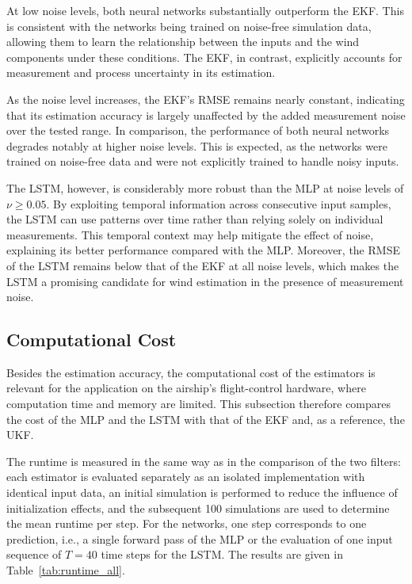 At low noise levels, both neural networks substantially outperform the EKF. This is consistent with the networks being trained on noise-free simulation data, allowing them to learn the relationship between the inputs and the wind components under these conditions. The EKF, in contrast, explicitly accounts for measurement and process uncertainty in its estimation.

As the noise level increases, the EKF's RMSE remains nearly constant, indicating that its estimation accuracy is largely unaffected by the added measurement noise over the tested range. In comparison, the performance of both neural networks degrades notably at higher noise levels. This is expected, as the networks were trained on noise-free data and were not explicitly trained to handle noisy inputs.

The LSTM, however, is considerably more robust than the MLP at noise levels of $\nu \geq 0.05$. By exploiting temporal information across consecutive input samples, the LSTM can use patterns over time rather than relying solely on individual measurements. This temporal context may help mitigate the effect of noise, explaining its better performance compared with the MLP. Moreover, the RMSE of the LSTM remains below that of the EKF at all noise levels, which makes the LSTM a promising candidate for wind estimation in the presence of measurement noise.





\subsection{Computational Cost}
\label{sec:5.5ComputationalCost}

Besides the estimation accuracy, the computational cost of the estimators is relevant for the application on the airship's flight-control hardware, where computation time and memory are limited. This subsection therefore compares the cost of the MLP and the LSTM with that of the EKF and, as a reference, the UKF.

The runtime is measured in the same way as in the comparison of the two filters: each estimator is evaluated separately as an isolated implementation with identical input data, an initial simulation is performed to reduce the influence of initialization effects, and the subsequent 100 simulations are used to determine the mean runtime per step. For the networks, one step corresponds to one prediction, i.e., a single forward pass of the MLP or the evaluation of one input sequence of $T = 40$ time steps for the LSTM. The results are given in Table~\ref{tab:runtime_all}.

